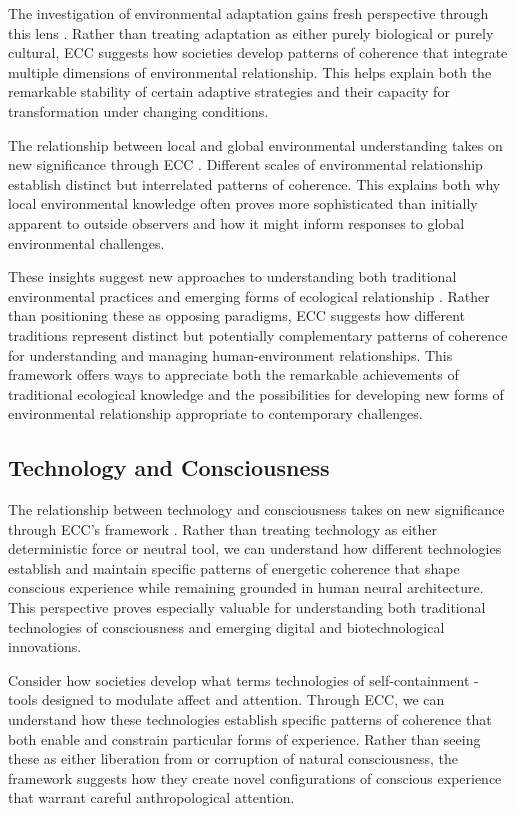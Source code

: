 The investigation of environmental adaptation gains fresh perspective through this lens \cite{strathern1980no}. Rather than treating adaptation as either purely biological or purely cultural, ECC suggests how societies develop patterns of coherence that integrate multiple dimensions of environmental relationship. This helps explain both the remarkable stability of certain adaptive strategies and their capacity for transformation under changing conditions.

The relationship between local and global environmental understanding takes on new significance through ECC \cite{tsing2015mushroom}. Different scales of environmental relationship establish distinct but interrelated patterns of coherence. This explains both why local environmental knowledge often proves more sophisticated than initially apparent to outside observers and how it might inform responses to global environmental challenges.

These insights suggest new approaches to understanding both traditional environmental practices and emerging forms of ecological relationship \cite{latour2004politics}. Rather than positioning these as opposing paradigms, ECC suggests how different traditions represent distinct but potentially complementary patterns of coherence for understanding and managing human-environment relationships. This framework offers ways to appreciate both the remarkable achievements of traditional ecological knowledge and the possibilities for developing new forms of environmental relationship appropriate to contemporary challenges.

\subsection{Technology and Consciousness}

The relationship between technology and consciousness takes on new significance through ECC's framework \cite{hayles2012how}. Rather than treating technology as either deterministic force or neutral tool, we can understand how different technologies establish and maintain specific patterns of energetic coherence that shape conscious experience while remaining grounded in human neural architecture. This perspective proves especially valuable for understanding both traditional technologies of consciousness and emerging digital and biotechnological innovations.

Consider how societies develop what \cite{turkle2011alone} terms technologies of self-containment - tools designed to modulate affect and attention. Through ECC, we can understand how these technologies establish specific patterns of coherence that both enable and constrain particular forms of experience. Rather than seeing these as either liberation from or corruption of natural consciousness, the framework suggests how they create novel configurations of conscious experience that warrant careful anthropological attention.

